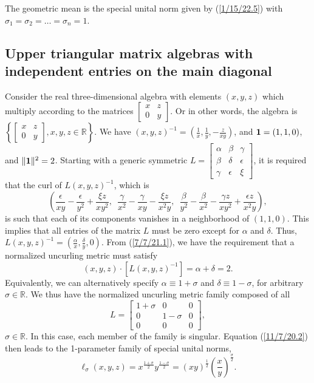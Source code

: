 \documentclass{amsart}
\numberwithin{equation}{section}
\theoremstyle{definition}
\numberwithin{theorem}{section}
\begin{document}
 The geometric mean is the special unital norm given by (\ref{1/15/22.5}) with $\sigma_1=\sigma_2=\dots =\sigma_n = 1$.  
   
 \subsection{Upper triangular matrix algebras with independent entries on the main diagonal} Consider the real three-dimensional algebra with elements $(x,y,z)$ which multiply according to the matrices 
$\left[
\begin{array}{ccc}
 x & z   \\
 0 & y    
\end{array}
\right]$.  Or in other words, the algebra is $\left\{ \left[
\begin{array}{ccc}
 x & z   \\
 0 & y    
\end{array}
\right],x,y,z\in\mathbb{R}\right\}$.  We have $(x,y,z)^{-1} = \left( \frac{1}{x}, \frac{1}{y}, -\frac{z}{xy} \right)$, and ${\bf 1}= (1,1,0)$, and $\|{\bf 1}\|^2 = 2$.  Starting with a generic symmetric $L = \left[
\begin{array}{ccc}
 \alpha & \beta & \gamma   \\
 \beta & \delta & \epsilon \\ \gamma & \epsilon & \xi    
\end{array}
\right]$, 
it is required that the curl of $L(x,y,z)^{-1}$, which is \[\left( \frac{\epsilon}{xy} - \frac{\epsilon}{y^2} + \frac{\xi z}{xy^2},\,\,\, \frac{\gamma}{x^2} - \frac{\gamma}{xy} - \frac{\xi z}{x^2y}, \,\,\, \frac{\beta}{y^2} - \frac{\beta}{x^2} - \frac{\gamma z}{xy^2} + \frac{\epsilon z}{x^2y} \right),\] is such that each of its components vanishes in a neighborhood of $(1,1,0)$.  This implies that all entries of the matrix $L$ must be zero except for $\alpha$ and $\delta$.   Thus, $L(x,y,z)^{-1} = (\frac{\alpha}{x}, \frac{\delta}{y},0)$.  From (\ref{7/7/21.1}), we have the requirement that a normalized uncurling metric must satisfy \[ (x,y,z)\cdot [L(x,y,z)^{-1}] = \alpha +\delta =  2.\]  Equivalently, we can alternatively specify $\alpha \equiv 1+\sigma$ and $\delta \equiv 1-\sigma$, for arbitrary $\sigma\in\mathbb{R}$.   We thus have the normalized uncurling metric family composed of all  \begin{equation}\label{11/17/22.2} L = \left[
\begin{array}{ccc}
 1+\sigma & 0 & 0   \\
 0 & 1-\sigma & 0 \\ 0 & 0 & 0    
\end{array}
\right],\end{equation} $\sigma\in\mathbb{R}$.  In this case, each member of the family is singular.  Equation (\ref{11/7/20.2}) then leads to the 1-parameter family of special unital norms, \begin{equation}\label{12/21/21.1} \ell_\sigma(x,y,z) = x^\frac{1+\sigma}{2} y^\frac{1-\sigma}{2} = (xy)^{\frac{1}{2}}\left(\frac{x}{y}\right)^{\frac{\sigma}{2}}.\end{equation} 
\end{document}

